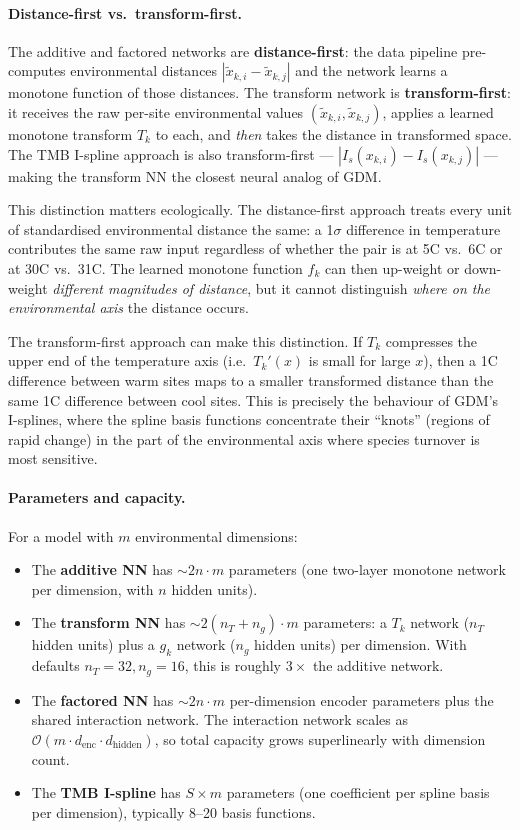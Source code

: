 \documentclass{article}
\begin{document}
\paragraph{Distance-first vs.\ transform-first.}
The additive and factored networks are \textbf{distance-first}: the data pipeline pre-computes environmental distances $|\tilde{x}_{k,i} - \tilde{x}_{k,j}|$ and the network learns a monotone function of those distances. The transform network is \textbf{transform-first}: it receives the raw per-site environmental values $(\tilde{x}_{k,i}, \tilde{x}_{k,j})$, applies a learned monotone transform $T_k$ to each, and \emph{then} takes the distance in transformed space. The TMB I-spline approach is also transform-first --- $|I_s(x_{k,i}) - I_s(x_{k,j})|$ --- making the transform NN the closest neural analog of GDM.

This distinction matters ecologically. The distance-first approach treats every unit of standardised environmental distance the same: a 1$\sigma$ difference in temperature contributes the same raw input regardless of whether the pair is at 5\textdegree C vs.\ 6\textdegree C or at 30\textdegree C vs.\ 31\textdegree C. The learned monotone function $f_k$ can then up-weight or down-weight \emph{different magnitudes of distance}, but it cannot distinguish \emph{where on the environmental axis} the distance occurs.

The transform-first approach can make this distinction. If $T_k$ compresses the upper end of the temperature axis (i.e.\ $T_k'(x)$ is small for large $x$), then a 1\textdegree C difference between warm sites maps to a smaller transformed distance than the same 1\textdegree C difference between cool sites. This is precisely the behaviour of GDM's I-splines, where the spline basis functions concentrate their ``knots'' (regions of rapid change) in the part of the environmental axis where species turnover is most sensitive.

\paragraph{Parameters and capacity.}
For a model with $m$ environmental dimensions:
\begin{itemize}
    \item The \textbf{additive NN} has $\sim 2n \cdot m$ parameters (one two-layer monotone network per dimension, with $n$ hidden units).
    \item The \textbf{transform NN} has $\sim 2(n_T + n_g) \cdot m$ parameters: a $T_k$ network ($n_T$ hidden units) plus a $g_k$ network ($n_g$ hidden units) per dimension. With defaults $n_T = 32, n_g = 16$, this is roughly $3\times$ the additive network.
    \item The \textbf{factored NN} has $\sim 2n \cdot m$ per-dimension encoder parameters plus the shared interaction network. The interaction network scales as $\mathcal{O}(m \cdot d_{\text{enc}} \cdot d_{\text{hidden}})$, so total capacity grows superlinearly with dimension count.
    \item The \textbf{TMB I-spline} has $S \times m$ parameters (one coefficient per spline basis per dimension), typically 8--20 basis functions.
\end{itemize}
\end{document}
